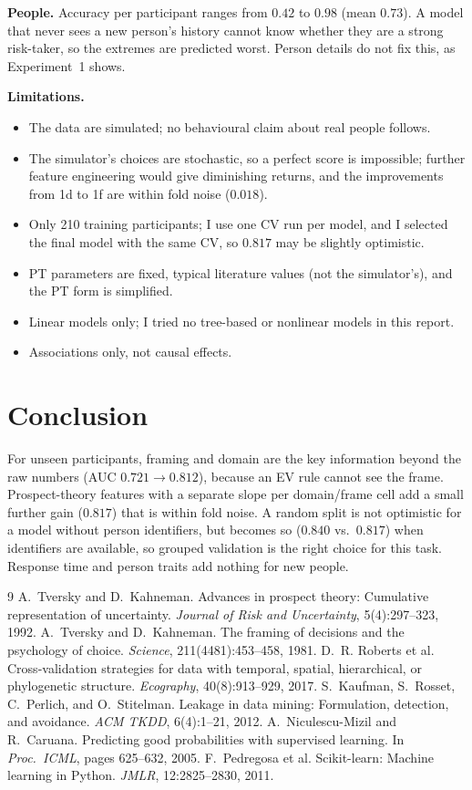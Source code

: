 \documentclass[11pt,a4paper]{article}
\begin{document}
\textbf{People.} Accuracy per participant ranges from $0.42$ to $0.98$ (mean $0.73$). A model that never sees a new person's history cannot know whether they are a strong risk-taker, so the extremes are predicted worst. Person details do not fix this, as Experiment~1 shows.

\textbf{Limitations.}
\begin{itemize}
\item The data are simulated; no behavioural claim about real people follows.
\item The simulator's choices are stochastic, so a perfect score is impossible; further feature engineering would give diminishing returns, and the improvements from 1d to 1f are within fold noise ($0.018$).
\item Only 210 training participants; I use one CV run per model, and I selected the final model with the same CV, so $0.817$ may be slightly optimistic.
\item PT parameters are fixed, typical literature values (not the simulator's), and the PT form is simplified.
\item Linear models only; I tried no tree-based or nonlinear models in this report.
\item Associations only, not causal effects.
\end{itemize}

\section{Conclusion}
For unseen participants, framing and domain are the key information beyond the raw numbers (AUC $0.721\to0.812$), because an EV rule cannot see the frame. Prospect-theory features with a separate slope per domain/frame cell add a small further gain ($0.817$) that is within fold noise. A random split is not optimistic for a model without person identifiers, but becomes so ($0.840$ vs.\ $0.817$) when identifiers are available, so grouped validation is the right choice for this task. Response time and person traits add nothing for new people.


\begin{thebibliography}{9}\small
{} A.~Tversky and D.~Kahneman. Advances in prospect theory: Cumulative representation of uncertainty. \emph{Journal of Risk and Uncertainty}, 5(4):297--323, 1992.
 A.~Tversky and D.~Kahneman. The framing of decisions and the psychology of choice. \emph{Science}, 211(4481):453--458, 1981.
 D.~R. Roberts et al. Cross-validation strategies for data with temporal, spatial, hierarchical, or phylogenetic structure. \emph{Ecography}, 40(8):913--929, 2017.
 S.~Kaufman, S.~Rosset, C.~Perlich, and O.~Stitelman. Leakage in data mining: Formulation, detection, and avoidance. \emph{ACM TKDD}, 6(4):1--21, 2012.
 A.~Niculescu-Mizil and R.~Caruana. Predicting good probabilities with supervised learning. In \emph{Proc.\ ICML}, pages 625--632, 2005.
 F.~Pedregosa et al. Scikit-learn: Machine learning in Python. \emph{JMLR}, 12:2825--2830, 2011.
\end{thebibliography}
\end{document}
